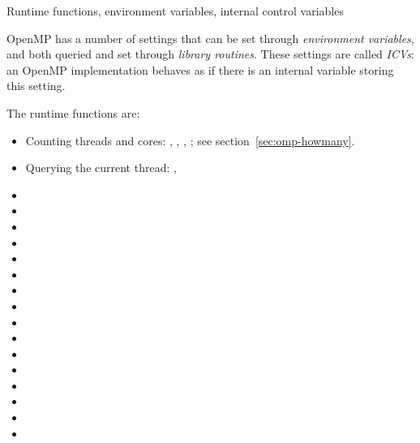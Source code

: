 
 {Runtime functions, environment variables, internal control variables}
\label{ref:omp-environ}

OpenMP has a number of settings that can be set through \emph{environment variables},
and both queried and set through \emph{library routines}. These settings are called
\emph{\acfp{ICV}}: an OpenMP implementation behaves as if there is an internal variable
storing this setting.

The runtime functions are:
\begin{itemize}
\item Counting threads and cores: ,
  ,
  , ;
  see section~\ref{sec:omp-howmany}.
\item Querying the current thread: , 
\item {}
\item {}
\item {}
\item {}
\item {}
\item {}
\item {}
\item {}
\item {}
\item {}
\item {}
\item {}
\item {}
\item {}
\item {}
\item {}
\end{itemize}

